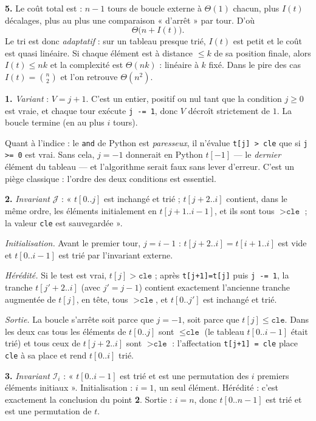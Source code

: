 \documentclass[11pt,a4paper]{article}
\begin{document}
\textbf{5.} Le coût total est : $n-1$ tours de boucle externe à $\Theta(1)$ chacun, plus
$I(t)$ décalages, plus au plus une comparaison « d'arrêt » par tour. D'où
\[
  \Theta\big(n + I(t)\big).
\]
Le tri est donc \emph{adaptatif} : sur un tableau presque trié, $I(t)$ est petit et le
coût est quasi linéaire. Si chaque élément est à distance $\le k$ de sa position finale,
alors $I(t)\le nk$ et la complexité est $\Theta(nk)$ : linéaire à $k$ fixé.
Dans le pire des cas $I(t)=\binom n2$ et l'on retrouve $\Theta(n^2)$.

\reponse
\textbf{1.} \emph{Variant} : $V=j+1$. C'est un entier, positif ou nul tant que la
condition $j\ge0$ est vraie, et chaque tour exécute \texttt{j -= 1}, donc $V$ décroît
strictement de $1$. La boucle termine (en au plus $i$ tours).

Quant à l'indice : le \texttt{and} de Python est \emph{paresseux}, il n'évalue
\texttt{t[j] > cle} que si \texttt{j >= 0} est vrai. Sans cela, $j=-1$ donnerait en
Python $t[-1]$ --- le \emph{dernier} élément du tableau --- et l'algorithme serait faux
sans lever d'erreur. C'est un piège classique : l'ordre des deux conditions est
essentiel.

\textbf{2.} \emph{Invariant} $\mathcal J$ : « $t[0..j]$ est inchangé et trié ;
$t[j+2..i]$ contient, dans le même ordre, les éléments initialement en $t[j+1..i-1]$,
et ils sont tous $>\texttt{cle}$ ; la valeur \texttt{cle} est sauvegardée ».

\emph{Initialisation.} Avant le premier tour, $j=i-1$ : $t[j+2..i]=t[i+1..i]$ est vide
et $t[0..i-1]$ est trié par l'invariant externe. \checkmark

\emph{Hérédité.} Si le test est vrai, $t[j]>\texttt{cle}$ ; après
\texttt{t[j+1]=t[j]} puis \texttt{j -= 1}, la tranche $t[j'+2..i]$ (avec $j'=j-1$)
contient exactement l'ancienne tranche augmentée de $t[j]$, en tête, tous
$>\texttt{cle}$, et $t[0..j']$ est inchangé et trié. \checkmark

\emph{Sortie.} La boucle s'arrête soit parce que $j=-1$, soit parce que
$t[j]\le\texttt{cle}$. Dans les deux cas tous les éléments de $t[0..j]$ sont
$\le\texttt{cle}$ (le tableau $t[0..i-1]$ était trié) et tous ceux de $t[j+2..i]$ sont
$>\texttt{cle}$ : l'affectation \texttt{t[j+1] = cle} place \texttt{cle} à sa place et
rend $t[0..i]$ trié.

\textbf{3.} \emph{Invariant} $\mathcal I_i$ : « $t[0..i-1]$ est trié et est une
permutation des $i$ premiers éléments initiaux ». Initialisation : $i=1$, un seul
élément. Hérédité : c'est exactement la conclusion du point \textbf{2}. Sortie : $i=n$,
donc $t[0..n-1]$ est trié et est une permutation de $t$. \checkmark
\end{document}
